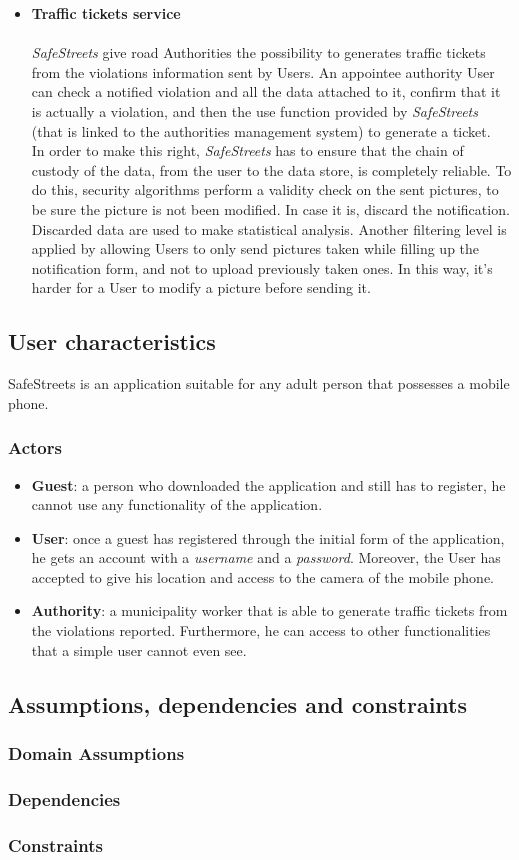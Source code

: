 \begin{itemize}
    
    \item\textbf{Traffic tickets service}\\\\
    \textit{SafeStreets} give road Authorities the possibility to generates traffic tickets from the violations information sent by Users. An appointee authority User can check a notified violation and all the data attached to it, confirm that it is actually a violation, and then the use function provided by \textit{SafeStreets} (that is linked to the authorities management system) to generate a ticket. \\
    In order to make this right, \textit{SafeStreets} has to ensure that the chain of custody of the data, from the user to the data store, is completely reliable. To do this, security algorithms perform a validity check on the sent pictures, to be sure the picture is not been modified. In case it is, discard the notification. Discarded data are used to make statistical analysis.
    Another filtering level is applied by allowing Users to only send pictures taken while filling up the notification form, and not to upload previously taken ones. In this way, it's harder for a User to modify a picture before sending it. 
\end{itemize}

\subsection{User
characteristics}
SafeStreets is an application suitable for any adult person that possesses a mobile phone.
\subsubsection{Actors}
\begin{itemize}
    \item \textbf{Guest}: a person who downloaded the application and still has to register, he cannot use any functionality of the application.
    \item \textbf{User}: once a guest has registered through the initial form of the application, he gets an account with a \textit{username} and a \textit{password}. Moreover, the User has accepted to give his location and access to the camera of the mobile phone.
    \item \textbf{Authority}: a municipality worker that is able to generate traffic tickets from the violations reported. Furthermore, he can access to other functionalities that a simple user cannot even see.
\end{itemize}
\subsection{Assumptions,
dependencies
and
constraints}
\subsubsection{Domain Assumptions}
\subsubsection{Dependencies}
\subsubsection{Constraints}

